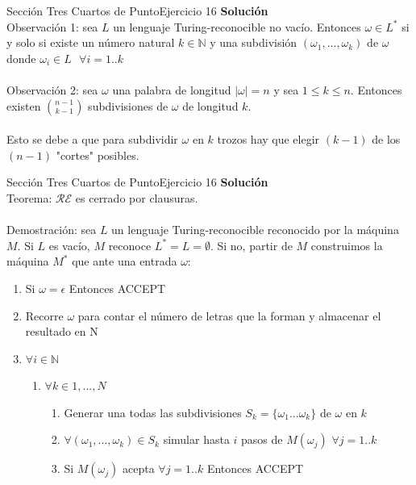 \documentclass[10pt, envcountsect, presentation, aspectratio=169]{beamer}
\begin{document}

\begin{frame}{Sección Tres Cuartos de Punto}{Ejercicio 16}
    \textbf{Solución}\\
    Observación 1: sea $L$ un lenguaje Turing-reconocible no vacío. 
    Entonces $\omega \in L^*$ si y solo si existe un número natural $k \in \mathbb{N}$ y una subdivisión $(\omega_1,...,\omega_k)$ de $\omega$ donde $\omega_i \in L \text{ } \forall i = 1..k$\\~\\

    Observación 2: sea $\omega$ una palabra de longitud $|\omega|=n$ y sea $1 \leq k \leq n$.
    Entonces existen ${n-1}\choose{k-1}$ subdivisiones de $\omega$ de longitud $k$.\\~\\

    Esto se debe a que para subdividir $\omega$ en $k$ trozos hay que elegir $(k-1)$ de los $(n-1)$ "cortes" posibles.
\end{frame}


\begin{frame}{Sección Tres Cuartos de Punto}{Ejercicio 16}
    \textbf{Solución}\\
    Teorema: $\mathcal{RE}$ es cerrado por clausuras.\\~\\

    Demostración: sea $L$ un lenguaje Turing-reconocible reconocido por la máquina $M$. Si $L$ es vacío, $M$ reconoce $L^*=L=\emptyset$. Si no, partir de $M$ construimos la máquina $M^*$ que ante una entrada $\omega$:
    \begin{enumerate}
        \item Si $\omega = \epsilon$ Entonces ACCEPT 
        \item Recorre $\omega$ para contar el número de letras que la forman y almacenar el resultado en N
        \item $\forall i \in \mathbb{N}$
        \begin{enumerate}
            \item $\forall k \in {1,...,N}$
            \begin{enumerate}
                \item Generar una todas las subdivisiones $S_k = \{\omega_1...\omega_k\}$ de $\omega$ en $k$ 
                \item $\forall (\omega_1,...,\omega_k) \in S_k$ simular hasta $i$ pasos de $M(\omega_j)$ $\forall j=1..k$
                \item Si $M(\omega_j)$ acepta $\forall j=1..k$ Entonces ACCEPT
            \end{enumerate}
        \end{enumerate}
    \end{enumerate}
\end{frame}
\end{document}
